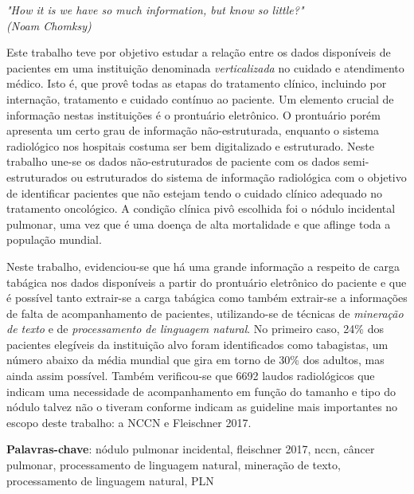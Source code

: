 \documentclass[
	12pt,				%
	openany,			%
  oneside,      %
	a4paper,			%
	brazil,			%
	french,			%
	spanish,			%
	english       %
	]{abntex2}
\begin{document}
\begin{epigrafe}
    \vspace*{\fill}
	\begin{flushright}
		\textit{"How it is we have so much information, but know so little?"\\
    (Noam Chomksy)}
	\end{flushright}
\end{epigrafe}


\setlength{\absparsep}{18pt} %
\begin{resumo}[Resumo]
  Este trabalho teve por objetivo estudar a relação entre os dados disponíveis de pacientes em uma instituição denominada \emph{verticalizada} no cuidado e atendimento médico. Isto é, que provê todas as etapas do tratamento clínico, incluindo por internação, tratamento e cuidado contínuo ao paciente. Um elemento crucial de informação nestas instituições é o prontuário eletrônico. O prontuário porém apresenta um certo grau de informação não-estruturada, enquanto o sistema radiológico nos hospitais costuma ser bem digitalizado e estruturado. Neste trabalho une-se os dados não-estruturados de paciente com os dados semi-estruturados ou estruturados do sistema de informação radiológica com o objetivo de identificar pacientes que não estejam tendo o cuidado clínico adequado no tratamento oncológico. A condição clínica pivô escolhida foi o nódulo incidental pulmonar, uma vez que é uma doença de alta mortalidade e que aflinge toda a população mundial. 

  Neste trabalho, evidenciou-se que há uma grande informação a respeito de carga tabágica nos dados disponíveis a partir do prontuário eletrônico do paciente e que é possível tanto extrair-se a carga tabágica como também extrair-se a informações de falta de acompanhamento de pacientes, utilizando-se de técnicas de \emph{mineração de texto} e de \emph{processamento de linguagem natural}. No primeiro caso, 24\% dos pacientes elegíveis da instituição alvo foram identificados como tabagistas, um número abaixo da média mundial que gira em torno de 30\% dos adultos, mas ainda assim possível. Também verificou-se que 6692 laudos radiológicos que indicam uma necessidade de acompanhamento em função do tamanho e tipo do nódulo talvez não o tiveram conforme indicam as guideline mais importantes no escopo deste trabalho: a NCCN e Fleischner 2017.

 \textbf{Palavras-chave}: nódulo pulmonar incidental, fleischner 2017, nccn, câncer pulmonar, processamento de linguagem natural, mineração de texto, processamento de linguagem natural, PLN
\end{resumo}
\end{document}
